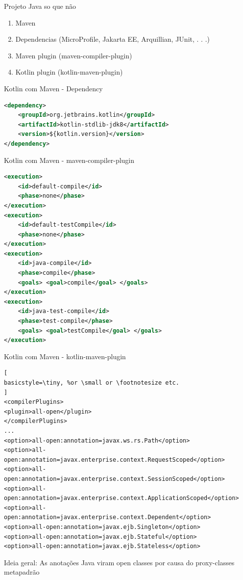 \documentclass[aspectratio=169]{beamer}
\begin{document}
\begin{frame}{Projeto Java so que não}
\begin{enumerate}
	\item Maven
	\item Dependencias (MicroProfile, Jakarta EE, Arquillian, JUnit, . . .)
	\item Maven plugin (maven-compiler-plugin)
	\item Kotlin plugin (kotlin-maven-plugin)
\end{enumerate}
\end{frame}


\begin{frame}[fragile]{Kotlin com Maven - Dependency}
\begin{lstlisting}[language=XML]
<dependency>
    <groupId>org.jetbrains.kotlin</groupId>
    <artifactId>kotlin-stdlib-jdk8</artifactId>
    <version>${kotlin.version}</version>
</dependency>
\end{lstlisting}
\end{frame}

\begin{frame}[fragile]{Kotlin com Maven - maven-compiler-plugin}
\begin{lstlisting}[language=xml,
basicstyle=\tiny, %or \small or \footnotesize etc.
]
<execution>
    <id>default-compile</id>
    <phase>none</phase>
</execution>
<execution>
    <id>default-testCompile</id>
    <phase>none</phase>
</execution>
<execution>
    <id>java-compile</id>
    <phase>compile</phase>
    <goals> <goal>compile</goal> </goals>
</execution>
<execution>
    <id>java-test-compile</id>
    <phase>test-compile</phase>
    <goals> <goal>testCompile</goal> </goals>
</execution>
\end{lstlisting}
\end{frame}


\begin{frame}[fragile]{Kotlin com Maven - kotlin-maven-plugin}
\begin{lstlisting}[
basicstyle=\tiny, %or \small or \footnotesize etc.
]
<compilerPlugins>
<plugin>all-open</plugin>
</compilerPlugins>
...
<option>all-open:annotation=javax.ws.rs.Path</option>
<option>all-open:annotation=javax.enterprise.context.RequestScoped</option>
<option>all-open:annotation=javax.enterprise.context.SessionScoped</option>
<option>all-open:annotation=javax.enterprise.context.ApplicationScoped</option>
<option>all-open:annotation=javax.enterprise.context.Dependent</option>
<option>all-open:annotation=javax.ejb.Singleton</option>
<option>all-open:annotation=javax.ejb.Stateful</option>
<option>all-open:annotation=javax.ejb.Stateless</option>
\end{lstlisting}

Ideia geral: As anotações Java viram open classes por causa do proxy-classes metapadrão
\end{frame}
\end{document}
